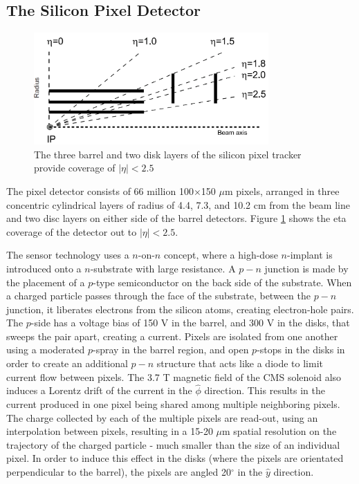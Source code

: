 \subsection{The Silicon Pixel Detector}
\label{tracker_pixel_description}

\begin{figure}[h]
   \centering
  \includegraphics[width=0.8\textwidth]{Figures/CMS_Diagrams/Tracker__Pixel_Rapidity.png}
  \caption{The three barrel and two disk layers of the silicon pixel
    tracker provide coverage of $|\eta|<2.5$ } \label{fig:tracker_pixel_eta_coverage}
\end{figure}

\par The pixel detector consists of 66 million 100$\times$150 $\mu$m
pixels, arranged in three concentric cylindrical layers of radius of
4.4, 7.3, and 10.2 cm from the beam line and two disc layers on either
side of the barrel detectors.  Figure
\ref{fig:tracker_pixel_eta_coverage} shows the eta coverage of the
detector out to $|\eta|<2.5$.   

\par The sensor technology uses a $n$-on-$n$ concept, where a
high-dose $n$-implant is introduced onto a $n$-substrate with large
resistance.  A $p-n$ junction is made by the placement of a $p$-type
semiconductor on the back side of the substrate.  When a charged
particle passes through the face of the substrate, between the $p-n$
junction, it liberates electrons from the silicon atoms, creating 
electron-hole pairs.  The $p$-side has a voltage bias of 150 V in the
barrel, and 300 V in the disks, that sweeps the pair apart, creating a
current.  Pixels are isolated from one another using a moderated
$p$-spray in the barrel region, and open $p$-stops in the disks in
order to create an additional $p-n$ structure that acts like a diode
to limit current flow between pixels.  The 3.7 T magnetic
field of the CMS solenoid also induces a Lorentz drift of the current
in the $\hat{\phi}$ direction.  This results in the current produced
in one pixel being shared among multiple neighboring pixels.  The
charge collected by each of the multiple pixels are read-out, using an
interpolation between pixels, resulting in a 15-20 $\mu$m spatial resolution
on the trajectory of the charged particle - much smaller than the size
of an individual pixel.  In order to induce this effect in the disks
(where the pixels are orientated perpendicular to the barrel), the
pixels are angled 20$^{\circ}$ in the $\hat{y}$ direction. 

